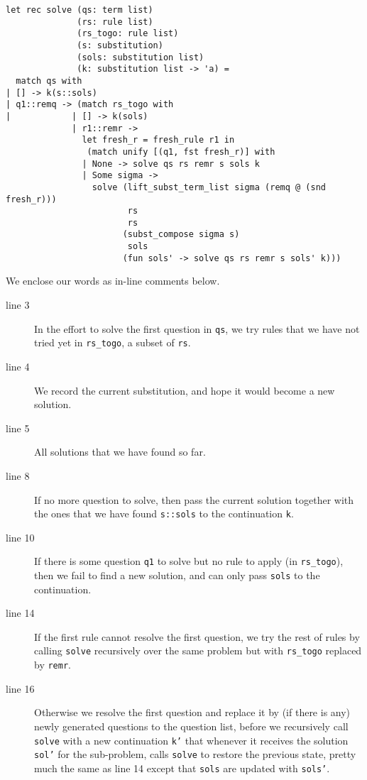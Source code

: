 \documentclass{article}
\begin{document}
\begin{verbatim}
let rec solve (qs: term list)
              (rs: rule list) 
              (rs_togo: rule list) 
              (s: substitution) 
              (sols: substitution list) 
              (k: substitution list -> 'a) =
  match qs with
| [] -> k(s::sols)
| q1::remq -> (match rs_togo with
|            | [] -> k(sols)
             | r1::remr -> 
               let fresh_r = fresh_rule r1 in
                (match unify [(q1, fst fresh_r)] with
               | None -> solve qs rs remr s sols k
               | Some sigma -> 
                 solve (lift_subst_term_list sigma (remq @ (snd fresh_r)))
                        rs
                        rs 
                       (subst_compose sigma s) 
                        sols 
                       (fun sols' -> solve qs rs remr s sols' k)))
\end{verbatim}

We enclose our words as in-line comments below.
\begin{description}
	\item[line 3] In the effort to solve the first question in {\tt qs}, we try rules that we have not tried yet in {\tt rs\_togo}, a subset of {\tt rs}. 
	\item[line 4] We record the current substitution, and hope it would become a new solution.
	\item[line 5] All solutions that we have found so far.
	\item[line 8] If no more question to solve, then pass the current solution together with the ones that we have found {\tt s::sols} to the continuation {\tt k}.
	\item[line 10] If there is some question {\tt q1} to solve but no rule to apply (in {\tt rs\_togo}), then we fail to find a new solution, and can only pass {\tt sols} to the continuation.
	\item[line 14] If the first rule cannot resolve the first question, we try the rest of rules by calling {\tt solve} recursively over the same problem but with {\tt rs\_togo} replaced by {\tt remr}.
	\item[line 16] Otherwise we resolve the first question and replace it by (if there is any) newly generated questions to the question list, before we recursively call {\tt solve} with a new continuation {\tt k'} that whenever it receives the solution {\tt sol'} for the sub-problem, calls {\tt solve} to restore the previous state, pretty much the same as line 14 except that {\tt sols} are updated with {\tt sols'}.
\end{description}
\end{document}
